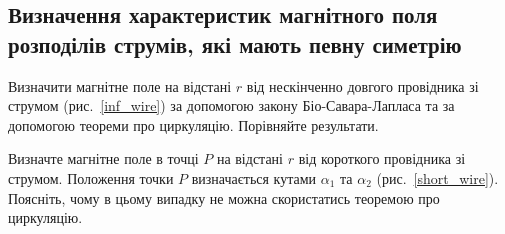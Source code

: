 \subsection*{Визначення характеристик магнітного поля розподілів струмів, які мають певну симетрію}

\begin{problem}\label{prb:inf_wire}
    Визначити магнітне поле на відстані $r$ від нескінченно довгого провідника зі струмом (рис.~\ref{inf_wire}) за допомогою закону Біо-Савара-Лапласа та за допомогою теореми про циркуляцію. Порівняйте результати.
\end{problem}

\begin{problem}\label{prb:short_wire}
    Визначте магнітне поле в точці $P$ на відстані $r$ від короткого провідника зі струмом. Положення точки $P$ визначається кутами $\alpha_1$ та $\alpha_2$ (рис.~\ref{short_wire}). Поясніть, чому в  цьому випадку не можна скористатись теоремою про циркуляцію.
\end{problem}
